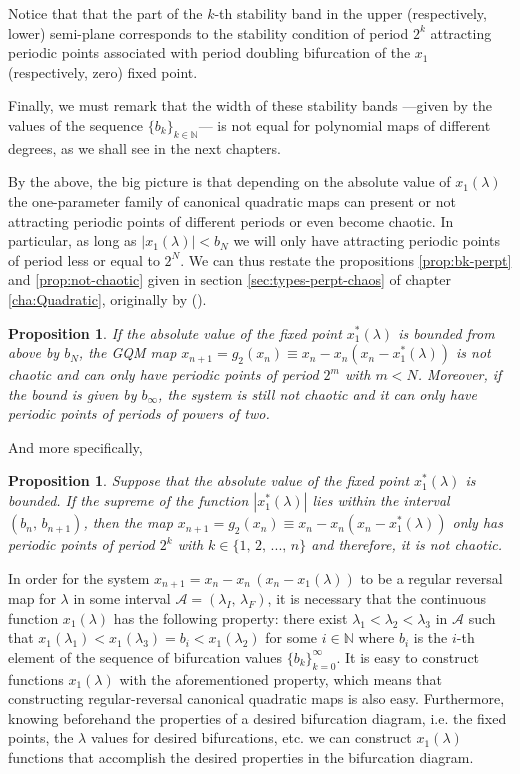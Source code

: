 \documentclass[10pt,twoside,titlepage]{book}
\numberwithin{equation}{chapter}
\numberwithin{figure}{chapter}
\numberwithin{table}{chapter}
\theoremstyle{plain}%
\newtheorem{prop}[thm]{Proposition}
\theoremstyle{definition}
\theoremstyle{remark}
\begin{document}
Notice that that the part of the $k$-th stability band in the upper (respectively, lower) semi-plane corresponds to the stability condition of period $2^k$ attracting periodic points associated with period doubling bifurcation of the $x_1$ (respectively, zero) fixed point.

Finally, we must remark that the width of these stability bands ---given by the values of the sequence $\{b_k\}_{k\in\mathbb{N}}$--- is not equal for polynomial maps of different degrees, as we shall see in the next chapters.

By the above, the big picture is that depending on the absolute value of $x_1(\lambda)$ the one-parameter family of canonical quadratic maps can present or not attracting periodic points of different periods or even become chaotic. In particular, as long as $\vert x_1(\lambda)\vert<b_N$ we will only have attracting periodic points of period less or equal to $2^N$. We can thus restate the propositions \ref{prop:bk-perpt} and \ref{prop:not-chaotic} given in section \ref{sec:types-perpt-chaos} of chapter \ref{cha:Quadratic}, originally by \cite{Solis2004} (\cite{Solis2004}).

\begin{prop}
	\label{prop:CQM-boundedmax1}
	If the absolute value of the fixed point $x_1^*(\lambda)$ is bounded from above by $b_{N}$, the GQM map $x_{n+1}=g_2(x_n)\equiv x_n - x_n (x_n-x_1^*(\lambda))$ is not chaotic and can only have periodic points of period $2^{m}$ with $m<N$. Moreover, if the bound is given by $b_{\infty}$, the system is still not chaotic and it can only have periodic points of periods of powers of two.
\end{prop}

And more specifically,

\begin{prop}
	\label{prop:CQM-boundedmax2}
	Suppose that the absolute value of the fixed point $x_1^*(\lambda)$ is bounded. If the supreme of the function $|x_1^*(\lambda)|$ lies within the interval $(b_{n},\, b_{n+1})$, then the map $x_{n+1}=g_2(x_{n})\equiv x_n - x_n (x_n-x_1^*(\lambda))$ only has periodic points of period $2^{k}$ with $k\in\{1,\,2,\,...,\, n\}$ and therefore, it is \emph{not} chaotic.
\end{prop}

In order for the system $x_{n+1}=x_n-x_n\,\left(x_n-x_1(\lambda)\right)$ to be a regular reversal map for $\lambda$ in some interval $\mathcal{A}=(\lambda_I,\,\lambda_F)$, it is necessary that the continuous function $x_1(\lambda)$ has the following property: there exist $\lambda_{1}<\lambda_{2}<\lambda_{3}$ in $\mathcal{A}$ such that $x_1(\lambda_{1})<x_1(\lambda_{3})=b_{i}<x_1(\lambda_{2})$ for some $i\in\mathbb{N}$ where $b_{i}$ is the $i$-th element of the sequence of bifurcation values $\{b_{k}\}_{k=0}^{\infty}$. It is easy to construct functions $x_1(\lambda)$ with the aforementioned property, which means that constructing regular-reversal canonical quadratic maps is also easy. Furthermore, knowing beforehand the properties of a desired bifurcation diagram, i.e. the fixed points, the $\lambda$ values for desired bifurcations, etc. we can construct $x_1(\lambda)$ functions that accomplish the desired properties in the bifurcation diagram.
\end{document}
